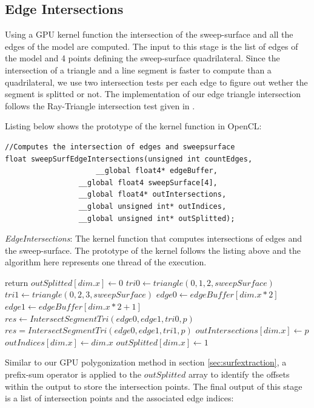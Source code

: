 \subsection{Edge Intersections}
Using a GPU kernel function the intersection of the sweep-surface and all the edges of the model are computed. 
The input to this stage is the list of edges of the model and 4 points defining the sweep-surface quadrilateral. 
Since the intersection of a triangle and a line segment is faster to compute than a quadrilateral, we 
use two intersection tests per each edge to figure out wether the segment is splitted or not. The implementation
of our edge triangle intersection follows the Ray-Triangle intersection test given in \cite{RTR3}.

Listing below shows the prototype of the kernel function in OpenCL:

\begin{lstlisting}[frame=single]
//Computes the intersection of edges and sweepsurface
float sweepSurfEdgeIntersections(unsigned int countEdges,
			         __global float4* edgeBuffer,
				 __global float4 sweepSurface[4],
				 __global float4* outIntersections,
				 __global unsigned int* outIndices,
				 __global unsigned int* outSplitted);
\end{lstlisting}
		     
\begin{algorithm}[H]
\caption{\textit{EdgeIntersections}: The kernel function that computes intersections of edges 
and the sweep-surface. The prototype of the kernel follows the listing above and the algorithm here represents one 
thread of the execution. }
\label{alg:edgeIntersections}
\begin{algorithmic}[1]	
  \STATE return
  \ENDIF
  \STATE $outSplitted[dim.x] \gets 0$
  \STATE $tri0 \gets triangle(0, 1, 2, sweepSurface)$
  \STATE $tri1 \gets triangle(0, 2, 3, sweepSurface)$
  \STATE $edge0 \gets edgeBuffer[dim.x * 2]$
  \STATE $edge1 \gets edgeBuffer[dim.x * 2 + 1]$
  \STATE $res \gets IntersectSegmentTri(edge0, edge1, tri0, p)$
  \STATE $res = IntersectSegmentTri(edge0, edge1, tri1, p)$
  \ENDIF
  \STATE $outIntersections[dim.x] \gets p$
  \STATE $outIndices[dim.x] \gets dim.x$
  \STATE $outSplitted[dim.x] \gets 1$
  \ENDIF
  
\end{algorithmic}
\end{algorithm}

Similar to our GPU polygonization method in section \ref{sec:surfextraction}, a prefix-sum operator is applied to 
the $outSplitted$ array to identify the offsets within the output to store the intersection points. 
The final output of this stage is a list of intersection points and the associated edge indices:

